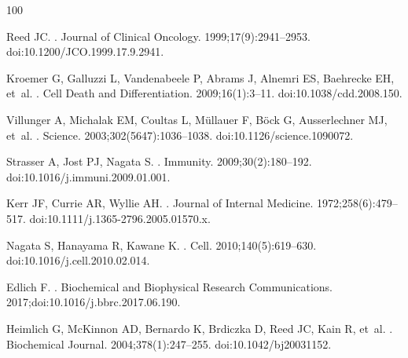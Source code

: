 \documentclass[10pt,letterpaper]{article}
\begin{document}
\begin{thebibliography}{100}

Reed JC.
.
\newblock Journal of Clinical Oncology. 1999;17(9):2941--2953.
\newblock doi:{10.1200/JCO.1999.17.9.2941}.

Kroemer G, Galluzzi L, Vandenabeele P, Abrams J, Alnemri ES, Baehrecke EH,
  et~al.
.
\newblock Cell Death and Differentiation. 2009;16(1):3--11.
\newblock doi:{10.1038/cdd.2008.150}.

Villunger A, Michalak EM, Coultas L, M{\"{u}}llauer F, B{\"{o}}ck G,
  Ausserlechner MJ, et~al.
.
\newblock Science. 2003;302(5647):1036--1038.
\newblock doi:{10.1126/science.1090072}.

Strasser A, Jost PJ, Nagata S.
.
\newblock Immunity. 2009;30(2):180--192.
\newblock doi:{10.1016/j.immuni.2009.01.001}.

Kerr JF, Currie AR, Wyllie AH.
.
\newblock Journal of Internal Medicine. 1972;258(6):479--517.
\newblock doi:{10.1111/j.1365-2796.2005.01570.x}.

Nagata S, Hanayama R, Kawane K.
.
\newblock Cell. 2010;140(5):619--630.
\newblock doi:{10.1016/j.cell.2010.02.014}.

Edlich F.
.
\newblock Biochemical and Biophysical Research Communications.
  2017;doi:{10.1016/j.bbrc.2017.06.190}.

Heimlich G, McKinnon AD, Bernardo K, Brdiczka D, Reed JC, Kain R, et~al.
.
\newblock Biochemical Journal. 2004;378(1):247--255.
\newblock doi:{10.1042/bj20031152}.


\end{thebibliography}
\end{document}

